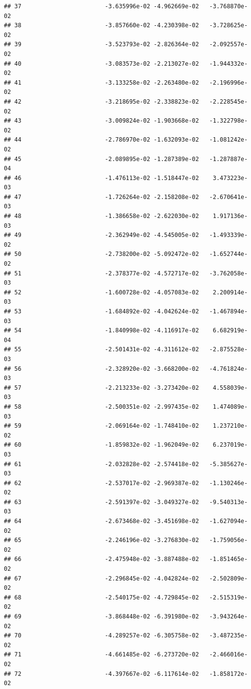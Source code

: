 \documentclass[
]{article}
\begin{document}
\begin{verbatim}
## 37                        -3.635996e-02 -4.962669e-02   -3.768870e-02
## 38                        -3.857660e-02 -4.230398e-02   -3.728625e-02
## 39                        -3.523793e-02 -2.826364e-02   -2.092557e-02
## 40                        -3.083573e-02 -2.213027e-02   -1.944332e-02
## 41                        -3.133258e-02 -2.263480e-02   -2.196996e-02
## 42                        -3.218695e-02 -2.338823e-02   -2.228545e-02
## 43                        -3.009824e-02 -1.903668e-02   -1.322798e-02
## 44                        -2.786970e-02 -1.632093e-02   -1.081242e-02
## 45                        -2.089895e-02 -1.287389e-02   -1.287887e-04
## 46                        -1.476113e-02 -1.518447e-02    3.473223e-03
## 47                        -1.726264e-02 -2.158208e-02   -2.670641e-03
## 48                        -1.386658e-02 -2.622030e-02    1.917136e-03
## 49                        -2.362949e-02 -4.545005e-02   -1.493339e-02
## 50                        -2.738200e-02 -5.092472e-02   -1.652744e-02
## 51                        -2.378377e-02 -4.572717e-02   -3.762058e-03
## 52                        -1.600728e-02 -4.057083e-02    2.200914e-03
## 53                        -1.684892e-02 -4.042624e-02   -1.467894e-03
## 54                        -1.840998e-02 -4.116917e-02    6.682919e-04
## 55                        -2.501431e-02 -4.311612e-02   -2.875528e-03
## 56                        -2.328920e-02 -3.668200e-02   -4.761824e-03
## 57                        -2.213233e-02 -3.273420e-02    4.558039e-03
## 58                        -2.500351e-02 -2.997435e-02    1.474089e-03
## 59                        -2.069164e-02 -1.748410e-02    1.237210e-02
## 60                        -1.859832e-02 -1.962049e-02    6.237019e-03
## 61                        -2.032828e-02 -2.574418e-02   -5.385627e-03
## 62                        -2.537017e-02 -2.969387e-02   -1.130246e-02
## 63                        -2.591397e-02 -3.049327e-02   -9.540313e-03
## 64                        -2.673468e-02 -3.451698e-02   -1.627094e-02
## 65                        -2.246196e-02 -3.276830e-02   -1.759056e-02
## 66                        -2.475948e-02 -3.887488e-02   -1.851465e-02
## 67                        -2.296845e-02 -4.042824e-02   -2.502809e-02
## 68                        -2.540175e-02 -4.729845e-02   -2.515319e-02
## 69                        -3.868448e-02 -6.391980e-02   -3.943264e-02
## 70                        -4.289257e-02 -6.305758e-02   -3.487235e-02
## 71                        -4.661485e-02 -6.273720e-02   -2.466016e-02
## 72                        -4.397667e-02 -6.117614e-02   -1.858172e-02

\end{verbatim}
\end{document}

